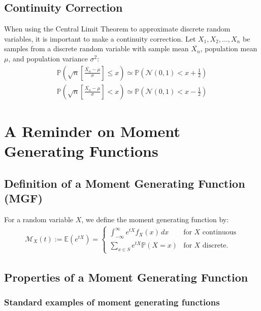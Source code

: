 \documentclass[a4paper, 12pt, twoside]{article}
\begin{document}
\subsection{Continuity Correction}

When using the Central Limit Theorem to approximate discrete random
variables, it is important to make a continuity correction. Let
$X_1, X_2, \ldots, X_n$ be samples from a discrete random variable
with sample mean $\overline{X_n}$, population mean $\mu$, and
population variance $\sigma^2$:
\begin{align*}
    \mathbb{P}\left( \sqrt{n}
    \left[\frac{\overline{X_n} - \mu}{\sigma}\right]
    \leq x \right) \simeq \mathbb{P}(\mathcal{N}(0, 1)
    < x + \frac{1}{2}) \\
    \mathbb{P}\left( \sqrt{n}
    \left[\frac{\overline{X_n} - \mu}{\sigma}\right]
    < x \right) \simeq \mathbb{P}(\mathcal{N}(0, 1)
    < x - \frac{1}{2})
\end{align*}

\section{A Reminder on Moment Generating Functions}

\subsection{Definition of a Moment Generating Function (MGF)}

For a random variable $X$, we define the moment generating function by:
\begin{align*}
    \mathcal{M}_X(t) := \mathbb{E}(e^{tX}) = \begin{cases}
        \int_{-\infty}^\infty e^{tX} f_X(x) \, dx & \text{for } X \text{ continuous} \\
        \sum_{x \in S} e^{tX} \mathbb{P}(X = x)   & \text{for } X \text{ discrete.}
    \end{cases}
\end{align*}

\subsection{Properties of a Moment Generating Function}

\subsubsection{Standard examples of moment generating functions}
\end{document}
